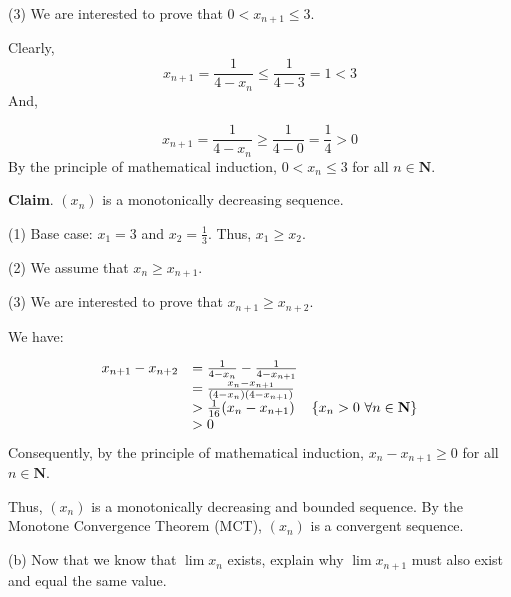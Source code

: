 \documentclass[10pt]{article}
\begin{document}
(3) We are interested to prove that $\displaystyle 0< x_{n+1} \leq 3$.



Clearly,
\begin{equation*}
x_{n+1} =\frac{1}{4-x_{n}} \leq \frac{1}{4-3} =1< 3
\end{equation*}
And,


\begin{equation*}
x_{n+1} =\frac{1}{4-x_{n}} \geq \frac{1}{4-0} =\frac{1}{4}  >0
\end{equation*}
By the principle of mathematical induction, $\displaystyle 0< x_{n} \leq 3$ for all $\displaystyle n\in \mathbf{N}$.



\textbf{Claim}. $\displaystyle ( x_{n})$ is a monotonically decreasing sequence.



(1) Base case: $\displaystyle x_{1} =3$ and $\displaystyle x_{2} =\frac{1}{3}$. Thus, $\displaystyle x_{1} \geq x_{2}$.



(2) We assume that $\displaystyle x_{n} \geq x_{n+1} .$



(3) We are interested to prove that $\displaystyle x_{n+1} \geq x_{n+2}$.



We have:


\begin{equation*}
\begin{array}{ c l c }
x_{n+1} -x_{n+2} & =\frac{1}{4-x_{n}} -\frac{1}{4-x_{n+1}} & \\
 & =\frac{x_{n} -x_{n+1}}{( 4-x_{n})( 4-x_{n+1})} & \\
 &  >\frac{1}{16}( x_{n} -x_{n+1}) & \{x_{n}  >0\ \forall n\in \mathbf{N}\}\\
 &  >0 & 
\end{array}
\end{equation*}
Consequently, by the principle of mathematical induction, $\displaystyle x_{n} -x_{n+1} \geq 0$ for all $\displaystyle n\in \mathbf{N}$.



Thus, $\displaystyle ( x_{n})$ is a monotonically decreasing and bounded sequence. By the Monotone Convergence Theorem (MCT), $\displaystyle ( x_{n})$ is a convergent sequence.



(b) Now that we know that $\displaystyle \lim x_{n}$ exists, explain why $\displaystyle \lim x_{n+1}$ must also exist and equal the same value.
\end{document}
